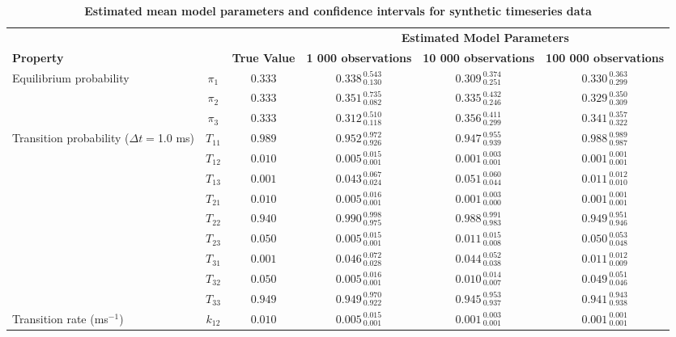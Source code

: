 
\begin{table*}
\caption{{\bf Estimated mean model parameters and confidence intervals for synthetic timeseries data}}
\label{table:synthetic-confidence-intervals}
\begin{tabular*}{\textwidth}{@{\extracolsep{\fill}}lccccc}
\hline
&  &  & \multicolumn{3}{c}{\bf Estimated Model Parameters}  \\ \cline{4-6}
\multicolumn{2}{l}{\bf Property} & \bf True Value & \bf 1 000 observations & \bf 10 000 observations & \bf 100 000 observations\\ \hline
		Equilibrium probability 		& $\pi_{1}$ & $0.333$ & $0.338_{\:0.130}^{\:0.543}$  & $0.309_{\:0.251}^{\:0.374}$  & $0.330_{\:0.299}^{\:0.363}$  \\
		& $\pi_{2}$ & $0.333$ & $0.351_{\:0.082}^{\:0.735}$  & $0.335_{\:0.246}^{\:0.432}$  & $0.329_{\:0.309}^{\:0.350}$  \\
		& $\pi_{3}$ & $0.333$ & $0.312_{\:0.118}^{\:0.510}$  & $0.356_{\:0.299}^{\:0.411}$  & $0.341_{\:0.322}^{\:0.357}$  \\
		\hline
		Transition probability ($\Delta t = $1.0 ms) 		& $T_{11}$ & $0.989$ & $0.952_{\:0.926}^{\:0.972}$ & $0.947_{\:0.939}^{\:0.955}$ & $0.988_{\:0.987}^{\:0.989}$ \\
		& $T_{12}$ & $0.010$ & $0.005_{\:0.001}^{\:0.015}$ & $0.001_{\:0.001}^{\:0.003}$ & $0.001_{\:0.001}^{\:0.001}$ \\
		& $T_{13}$ & $0.001$ & $0.043_{\:0.024}^{\:0.067}$ & $0.051_{\:0.044}^{\:0.060}$ & $0.011_{\:0.010}^{\:0.012}$ \\
		& $T_{21}$ & $0.010$ & $0.005_{\:0.001}^{\:0.016}$ & $0.001_{\:0.000}^{\:0.003}$ & $0.001_{\:0.001}^{\:0.001}$ \\
		& $T_{22}$ & $0.940$ & $0.990_{\:0.975}^{\:0.998}$ & $0.988_{\:0.983}^{\:0.991}$ & $0.949_{\:0.946}^{\:0.951}$ \\
		& $T_{23}$ & $0.050$ & $0.005_{\:0.001}^{\:0.015}$ & $0.011_{\:0.008}^{\:0.015}$ & $0.050_{\:0.048}^{\:0.053}$ \\
		& $T_{31}$ & $0.001$ & $0.046_{\:0.028}^{\:0.072}$ & $0.044_{\:0.038}^{\:0.052}$ & $0.011_{\:0.009}^{\:0.012}$ \\
		& $T_{32}$ & $0.050$ & $0.005_{\:0.001}^{\:0.016}$ & $0.010_{\:0.007}^{\:0.014}$ & $0.049_{\:0.046}^{\:0.051}$ \\
		& $T_{33}$ & $0.949$ & $0.949_{\:0.922}^{\:0.970}$ & $0.945_{\:0.937}^{\:0.953}$ & $0.941_{\:0.938}^{\:0.943}$ \\
		\hline
		\hline
		Transition rate (ms$^{-1}$) 		& $k_{12}$ & $0.010$ & $0.005_{\:0.001}^{\:0.015}$ & $0.001_{\:0.001}^{\:0.003}$ & $0.001_{\:0.001}^{\:0.001}$ \\

\end{tabular*}
\end{table*}
